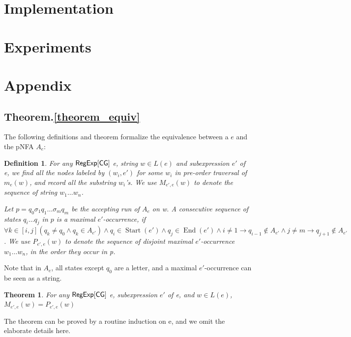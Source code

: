 \documentclass[sigplan,review,anonymous]{acmart}\settopmatter{printfolios=true,printccs=false,printacmref=false}
\newcommand{\tmop}[1]{\ensuremath{\operatorname{#1}}}
\newtheorem{definition}{Definition}
\newtheorem{theorem}{Theorem}
\begin{document}
\section{Implementation}

\section{Experiments}

\begin{acks}                            %
\end{acks}


\appendix
\section{Appendix}

\label{appendix_ref}

\subsection{Theorem.\ref{theorem_equiv}}

The following definitions and theorem formalize the equivalence between a \regexp[\sf CG]
$e$ and the pNFA $A_e$:

\begin{definition}
  For any ${\sf RegExp}[\sf CG]$ e, string $w \in L (e)$ and subexpression $e'$ of
  e, we find all the nodes labeled by $(w_i, e')$ for some $w_i$ in
  pre-order traversal of $m_e (w)$, and record all the substring $w_i$'s. We
  use $M_{e', e} (w)$ to denote the sequence of string $w_1 \ldots w_n$.
  
  Let $p = q_0 \sigma_1 q_1 \ldots
  \sigma_m q_m$ be the accepting run of $A_e$ on w. A consecutive
  sequence of states $q_i \ldots q_j$ in $p$ is a maximal $e'$-occurrence, if 
  $\forall k \in [i, j] (q_k \neq q_0 \wedge q_k \in A_{e'}) \wedge q_i \in
  \tmop{Start} (e') \wedge q_j \in \tmop{End} (e') \wedge i \neq 1 \rightarrow
  q_{i - 1} \nin A_{e'} \wedge j \neq m \rightarrow q_{j + 1} \nin A_{e'}$. We
  use $P_{e', e} (w)$ to denote the sequence of disjoint maximal
  $e'$-occurrence $w_1 \ldots w_n$, in the order they occur in p.
\end{definition}

 Note that in
  $A_e$, all states except $q_0$ are a letter, and a maximal $e'$-occurrence
  can be seen as a string.
  
\begin{theorem}
  For any ${\sf RegExp}[\sf CG]$ e, subexpression $e'$ of e, and $w \in L (e)$,
  $M_{e', e} (w) = P_{e', e} (w)$
\end{theorem}

The theorem can be proved by a routine induction on e, and we omit the
elaborate details here.
\end{document}
